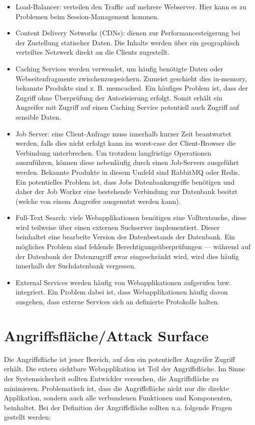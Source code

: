 \begin{itemize}
	\item Load-Balancer: verteilen den Traffic auf mehrere Webserver. Hier kann es zu Problemen beim Session-Management kommen.
	\item Content Delivery Networks (CDNs): dienen zur Performancesteigerung bei der Zustellung statischer Daten. Die Inhalte werden über ein geographisch verteiltes Netzwerk direkt an die Clients zugestellt.
	\item Caching Services werden verwendet, um häufig benötigte Daten oder Webseitenfragmente zwischenzuspeichern. Zumeist geschieht dies in-memory, bekannte Produkte sind z. B. memcached. Ein häufiges Problem ist, dass der Zugriff ohne Überprüfung der Autorisierung erfolgt. Somit erhält ein Angreifer mit Zugriff auf einen Caching Service potentiell auch Zugriff auf sensible Daten.
	\item Job Server: eine Client-Anfrage muss innerhalb kurzer Zeit beantwortet werden, falls dies nicht erfolgt kann im worst-case der Client-Browser die Verbindung unterbrechen. Um trotzdem langfristige Operationen auszuführen, können diese nebenläufig durch einen Job-Servers ausgeführt werden. Bekannte Produkte in diesem Umfeld sind RabbitMQ oder Redis. Ein potentielles Problem ist, dass Jobs Datenbankzugriffe benötigen und daher der Job Worker eine bestehende Verbindung zur Datenbank besitzt (welche von einem Angreifer ausgenutzt werden kann).
	\item Full-Text Search: viele Webapplikationen benötigen eine Volltextsuche, diese wird teilweise über einen externen Suchserver implementiert. Dieser beinhaltet eine bearbeite Version des Datenbestands der Datenbank. Ein mögliches Problem sind fehlende Berechtigungsüberprüfungen --- während auf der Datenbank der Datenzugriff zwar eingeschränkt wird, wird dies häufig innerhalb der Suchdatenbank vergessen.
	\item External Services werden häufig von Webapplikationen aufgerufen bzw. integriert. Ein Problem dabei ist, dass Webapplikationen häufig davon ausgehen, dass externe Services sich an definierte Protokolle halten.
\end{itemize}

\section{Angriffsfläche/Attack Surface}

Die Angriffsfläche ist jener Bereich, auf den ein potentieller Angreifer Zugriff erhält. Die extern sichtbare Webapplikation ist Teil der Angriffsfläche. Im Sinne der Systemsicherheit sollten Entwickler versuchen, die Angriffsfläche zu minimieren. Problematisch ist, dass die Angriffsfläche nicht nur die direkte Applikation, sondern auch alle verbundenen Funktionen und Komponenten, beinhaltet. Bei der Definition der Angriffsfläche sollten u.a. folgende Fragen gestellt werden: 

